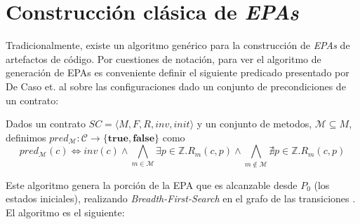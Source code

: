 
\section{Construcción clásica de \textit{EPAs}}
Tradicionalmente, existe un algoritmo genérico para la construcción de \textit{EPAs} de artefactos de código.
Por cuestiones de notación, para ver el algoritmo de generación de EPAs es conveniente definir el siguiente predicado presentado por De Caso et. al \cite{de-caso-epa} sobre las configuraciones dado un conjunto de precondiciones de un contrato:

\begin{definition}
    Dados un contrato $SC = \langle M, F, R, inv, init \rangle$ y un conjunto de metodos, $\mathcal{M} \subseteq M$, definimos $pred_\mathcal{M} : \mathcal{C} \rightarrow \{\textbf{true}, \textbf{false}\}$ como
    \[pred_\mathcal{M}(c) \iff inv(c) \land \bigwedge\limits_{m \in \mathcal{M}} \exists p \in \mathds{Z} . R_m(c,p) \land \bigwedge\limits_{   m \notin \mathcal{M}} \nexists p \in \mathds{Z} . R_m(c,p)\]
\end{definition}
Este algoritmo genera la porción de la EPA que es alcanzable desde $P_0$ (los estados iniciales), realizando \textit{Breadth-First-Search} en el grafo de las transiciones \cite{de-caso-epa}.
El algoritmo es el siguiente:


